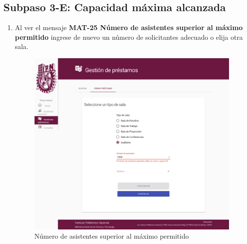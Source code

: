 \subsection{Subpaso 3-E: Capacidad máxima alcanzada}
\begin{enumerate}
	\item Al ver el mensaje
\textbf{MAT-25 Número de asistentes superior al máximo permitido} ingrese de nuevo un número de solicitantes adecuado o elija otra sala.
	  \begin{figure}[hbtp]
	\includegraphics[scale=0.3]{images/Interfaz/MAT-25 Número de asistentes superior al máximo permitido.png}
	\caption{Número de asistentes superior al máximo permitido}
	\end{figure}
\end{enumerate}

